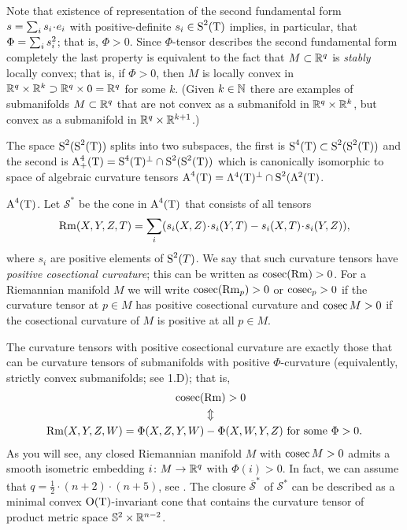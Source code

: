 \documentclass{article}
\begin{document}
Note that existence of representation of the second fundamental form
$s\z=\sum_i s_i\cdot e_i$ with positive-definite $s_i\in \S^2(\T)$
implies, in particular, that $\Phi\z=\sum_i s_i^2$;
that is, $\Phi> 0$.
Since $\Phi$-tensor describes the second fundamental form completely the
last property is equivalent to the fact that
$M\i \RR^q$ is \textit{stably} locally convex; that is, if $\Phi>0$, then $M$ is locally convex in $\RR^q\times \RR^k\supset\RR^q\times 0\z=\RR^q$ for some $k$.
(Given $k\in \NN$ there are examples of submanifolds $M\i \RR^q$
that are not convex as a submanifold in $\RR^q\times \RR^k$,
but convex as a submanifold in $\RR^q\times \RR^{k+1}$.)


The space $\S^2(\S^2(\T))$ splits into two subspaces,
the first is $\S^4(\T)\i \S^2(\S^2(\T))$ and the second is
$\A^4_+(\T)=\S^4(\T)^\bot\cap \S^2(\S^2(\T))$
which is canonically isomorphic to space of algebraic curvature tensors
$\A^4(\T)=\Lambda^4(\T)^\bot\cap \S^2(\Lambda^2(\T)$.

\medskip

\noindent
$\A^4(\T)$. 
Let $\mathcal{S}^*$ be the cone in $\A^4(\T)$ that consists of all tensors
$$\Rm(X,Y,Z,T)=\sum_i (s_i(X,Z)\cdot s_i(Y,T)-s_i(X,T)\cdot s_i(Y,Z)),$$ where
$s_i$  are positive elements of $\S^2(T)$. 
We say that such
curvature tensors have \emph{positive cosectional curvature};
this can be written as $\cosec (\Rm)>0$. 
For a Riemannian manifold $M$ we will write $\cosec (\Rm_p)>0$ or $\cosec_p>0$ if
the curvature tensor at $p\in M$ has positive cosectional curvature and
$\cosec M>0$ if the cosectional curvature of $M$ is positive at
all $p\in M$.

The curvature tensors with positive cosectional curvature are exactly
those that can be curvature tensors of submanifolds with positive
$\Phi$-curvature (equivalently, strictly convex submanifolds; see 1.D);
that is,
\begin{align*}
\cosec(&\Rm)>0
\\
&\Updownarrow
\\
\Rm(X,Y,Z,W)=\Phi(X,Z,Y,W)&-\Phi(X,W,Y,Z) \text{ for
some } \Phi>0.
\end{align*}
As you will see, any closed Riemannian
manifold $M$ with $\cosec M>0$ admits a smooth isometric embedding
$i\:M\to \RR^q$ with $\Phi(i)>0$.
In fact, we can assume that $q=\tfrac12\cdot(n+2)\cdot(n+5)$, see \cite[3.1.5(A) and 3.1.2(C)]{Grom-PDR}. 
The closure $\overline{\mathcal{S}}^*$ of  $\mathcal{S}^*$ can be
described as a minimal convex $\O(\T)$-invariant cone that contains the curvature tensor of product metric space $\SS^2\times \RR^{n-2}$.
\end{document}
